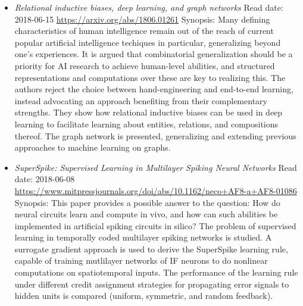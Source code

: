 \documentclass{article}%
\begin{document}
\begin{itemize}
\newline%
Read date: 2018{-}07{-}12%
\newline%
\href{https://arxiv.org/abs/1802.05405}{https://arxiv.org/abs/1802.05405}%
\newline%
Synopsis: The moth olfactory network model of Biological Mechanisms for Learning: A Computational Model... is used to classify the MNIST digits using a very small number of samples per digit class (1{-}20).%
\item%
\textit{Relational inductive biases, deep learning, and graph networks}%
\newline%
Read date: 2018{-}06{-}15%
\newline%
\href{https://arxiv.org/abs/1806.01261}{https://arxiv.org/abs/1806.01261}%
\newline%
Synopsis: Many defining characteristics of human intelligence remain out of the reach of current popular artificial intelligence techiques in particular, generalizing beyond one's experiences. It is argued that combinatorial generalization should be a priority for AI research to achieve human{-}level abilities, and structured representations and computations over these are key to realizing this. The authors reject the choice between hand{-}engineering and end{-}to{-}end learning, instead advocating an approach benefiting from their complementary strengths. They show how relational inductive biases can be used in deep learning to facilitate learning about entities, relations, and compositions thereof. The graph network is presented, generalizing and extending previous approaches to machine learning on graphs.%
\item%
\textit{SuperSpike: Supervised Learning in Multilayer Spiking Neural Networks}%
\newline%
Read date: 2018{-}06{-}08%
\newline%
\href{https://www.mitpressjournals.org/doi/abs/10.1162/neco+AF8{-}a+AF8{-}01086}{https://www.mitpressjournals.org/doi/abs/10.1162/neco+AF8{-}a+AF8{-}01086}%
\newline%
Synopsis: This paper provides a possible answer to the question: How do neural circuits learn and compute in vivo, and how can such abilities be implemented in artificial spiking circuits in silico? The problem of supervised learning in temporally coded multilayer spiking networks is studied. A surrogate gradient approach is used to derive the SuperSpike learning rule, capable of training mutlilayer networks of IF neurons to do nonlinear computations on spatiotemporal inputs. The performance of the learning rule under different credit assignment strategies for propagating error signals to hidden units is compared (uniform, symmetric, and random feedback).%

\end{itemize}
\end{document}
